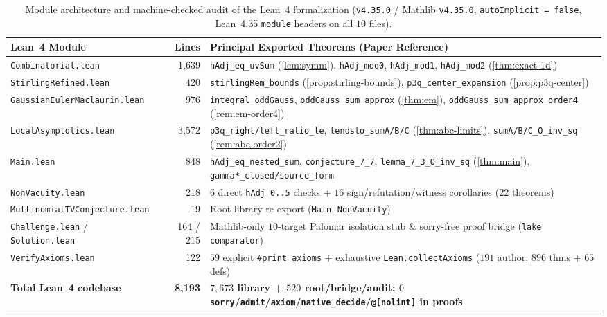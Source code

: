 \documentclass[11pt,a4paper]{article}
\numberwithin{equation}{section}
\theoremstyle{plain}
\theoremstyle{definition}
\theoremstyle{remark}
\newcommand{\code}[1]{\texttt{\small #1}}
\begin{document}
\begin{table}[t]
\centering
\caption{Module architecture and machine-checked audit of the Lean~4 formalization (\code{v4.35.0} / Mathlib \code{v4.35.0}, \code{autoImplicit = false}, Lean~4.35 \code{module} headers on all $10$ files).}
\label{tab:lean-modules}
\footnotesize
\setlength{\tabcolsep}{4.5pt}
\begin{tabular}{@{}l r >{\raggedright\arraybackslash}p{8.4cm}@{}}
\toprule
Lean~4 Module & Lines & Principal Exported Theorems (Paper Reference) \\
\midrule
\code{Combinatorial.lean} & 1,639 & \code{hAdj\_eq\_uvSum} (\cref{lem:symm}), \code{hAdj\_mod0}, \code{hAdj\_mod1}, \code{hAdj\_mod2} (\cref{thm:exact-1d}) \\
\code{StirlingRefined.lean} & 420 & \code{stirlingRem\_bounds} (\cref{prop:stirling-bounds}), \code{p3q\_center\_expansion} (\cref{prop:p3q-center}) \\
\code{GaussianEulerMaclaurin.lean} & 976 & \code{integral\_oddGauss}, \code{oddGauss\_sum\_approx} (\cref{thm:em}), \code{oddGauss\_sum\_approx\_order4} (\cref{rem:em-order4}) \\
\code{LocalAsymptotics.lean} & 3,572 & \code{p3q\_right/left\_ratio\_le}, \code{tendsto\_sumA/B/C} (\cref{thm:abc-limits}), \code{sumA/B/C\_O\_inv\_sq} (\cref{rem:abc-order2}) \\
\code{Main.lean} & 848 & \code{hAdj\_eq\_nested\_sum}, \code{conjecture\_7\_7}, \code{lemma\_7\_3\_O\_inv\_sq} (\cref{thm:main}), \code{gamma*\_closed/source\_form} \\
\code{NonVacuity.lean} & 218 & $6$ direct \code{hAdj 0..5} checks + $16$ sign/refutation/witness corollaries ($22$ theorems) \\
\code{MultinomialTVConjecture.lean} & 19 & Root library re-export (\code{Main}, \code{NonVacuity}) \\
\midrule
\code{Challenge.lean} / \code{Solution.lean} & 164 / 215 & Mathlib-only $10$-target Palomar isolation stub \& sorry-free proof bridge (\code{lake comparator}) \\
\code{VerifyAxioms.lean} & 122 & $59$ explicit \code{\#print axioms} + exhaustive \code{Lean.collectAxioms} ($191$ author; $896$ thms + $65$ defs) \\
\midrule
\textbf{Total Lean~4 codebase} & \textbf{8,193} & \textbf{$7{,}673$ library + $520$ root/bridge/audit; $0$ \code{sorry}/\code{admit}/\code{axiom}/\code{native\_decide}/\code{@[nolint]} in proofs} \\
\bottomrule
\end{tabular}
\end{table}
\end{document}
